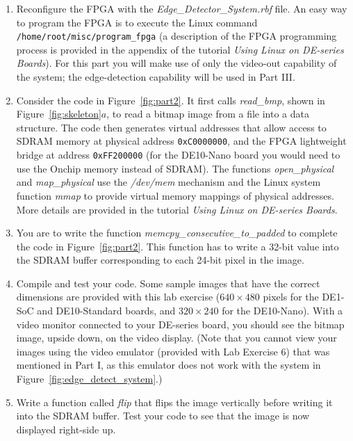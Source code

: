 \documentclass[epsfig,10pt,fullpage]{article}
\begin{document}
\begin{enumerate}
\item
Reconfigure the FPGA with the \textit{Edge\_Detector\_System.rbf} file. An easy way to
program the FPGA is to execute the Linux command \texttt{/home/root/misc/program\_fpga}
(a description of the FPGA programming process is provided in the appendix of the 
tutorial \textit{Using Linux on DE-series Boards}). For this part you will make use of only 
the video-out capability of the system; the edge-detection capability will be used in Part III.

\item
Consider the code in Figure~\ref{fig:part2}. It first calls {\it read\_bmp}, shown in 
Figure~\ref{fig:skeleton}$a$, to read a bitmap image from a file into a data structure. 
The code then generates virtual addresses that allow access to SDRAM memory at physical 
address \texttt{0xC0000000}, and the FPGA lightweight bridge at address \texttt{0xFF200000}
(for the DE10-Nano board you would need to use the Onchip memory instead of SDRAM).
The functions {\it open\_physical} and {\it map\_physical} use the {\it /dev/mem} mechanism 
and the Linux system function {\it mmap} to provide virtual memory mappings of physical 
addresses. More details are provided in the tutorial {\it Using Linux on DE-series Boards}.

\item
You are to write the function {\it memcpy\_consecutive\_to\_padded} to complete the code in 
Figure~\ref{fig:part2}. This function has to write a 32-bit value into the SDRAM buffer
corresponding to each 24-bit pixel in the image.

\item
Compile and test your code. Some sample images that have the correct dimensions are provided with
this lab exercise ($640 \times 480$ pixels for the DE1-SoC and DE10-Standard boards, and $320
\times 240$ for the DE10-Nano). With a video monitor connected to your DE-series board, you 
should see the bitmap image, upside down, on the video display. (Note that you cannot
view your images using the video emulator (provided with Lab Exercise 6) that was mentioned in 
Part I, as this emulator does not work with the system in Figure~\ref{fig:edge_detect_system}.)

\item
Write a function called {\it flip} that flips the image vertically before writing it into
the SDRAM buffer. Test your code to see that the image is now displayed right-side up.

\end{enumerate}
\end{document}
